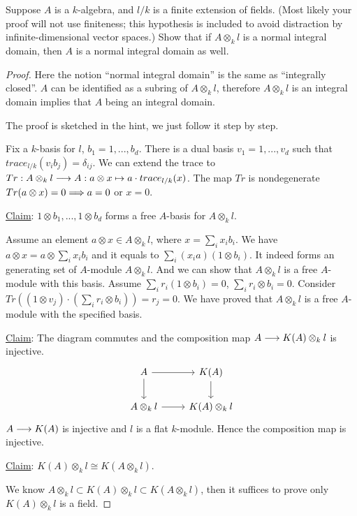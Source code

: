 \documentclass[11pt]{book} %
\begin{document}
\begin{exr}
Suppose $A$ is a $k$-algebra, and $l/k$ is a finite extension of fields. (Most likely your proof will not use finiteness; this hypothesis is included to avoid distraction by infinite-dimensional vector spaces.) Show that if $A\otimes_k l$ is a normal integral domain, then $A$ is a normal integral domain as well.
\end{exr}
\begin{proof}
Here the notion ``normal integral domain'' is the same as ``integrally closed''. $A$ can be identified as a subring of $A\otimes_k l$, therefore $A\otimes_k l$ is an integral domain implies that $A$ being an integral domain. 

The proof is sketched in the hint, we just follow it step by step.

 Fix a $k$-basis for $l$, $b_1=1,...,b_d$. There is a dual basis $v_1=1,...,v_d$ such that $trace_{l/k}(v_i b_j)=\delta_{ij}$. We can extend the trace to $Tr:A\otimes_k l\longrightarrow A: a\otimes x\mapsto a\cdot trace_{l/k}(x)$. The map $Tr$ is nondegenerate $Tr(a\otimes x)=0\Longrightarrow a=0$ or $x=0$.

 \underline{Claim}: $1\otimes b_1,...,1\otimes b_d$ forms a free $A$-basis for $A\otimes_k l$. 

 Assume an element $a\otimes x\in A\otimes_k l$, where $x=\sum_i x_i b_i$. We have 
 $a\otimes x=a\otimes \sum_i x_i b_i$ and it equals to $\sum_i (x_i a) (1\otimes b_i)$. It indeed forms an generating set of  $A$-module $A\otimes_k l$. And we can show that $A\otimes_k l$ is a free $A$-module with this basis. Assume $\sum_i r_i(1\otimes b_i)=0$, $\sum_i r_i\otimes b_i=0$. Consider $Tr((1\otimes v_j)\cdot (\sum_i r_i\otimes b_i))=r_j=0$. We have proved that $A\otimes_k l$ is a free $A$-module with the specified basis.

 \underline{Claim}: The diagram commutes and the composition map $A\longrightarrow K(A)\otimes_k l$ is injective.
\[
\begin{tikzcd}
A \arrow[r] \arrow[d] & K(A) \arrow[d] \\
A\otimes_k l \arrow[r] & K(A)\otimes_k l
\end{tikzcd}
\]
$A\longrightarrow K(A)$ is injective and $l$ is a flat $k$-module. Hence the composition map is injective.

\underline{Claim}: $K(A)\otimes_k l\cong K(A\otimes_k  l)$.

We know $A\otimes_k l\subset K(A)\otimes_k l\subset K(A\otimes_k l)$, then it suffices to prove only $K(A)\otimes_k l$ is a field.


\end{proof}
\end{document}
